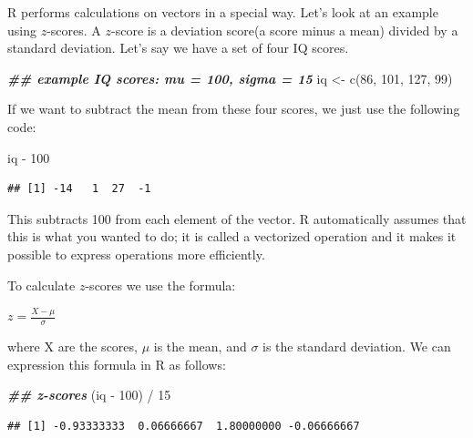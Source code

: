 \documentclass[
  oneside]{book}
\newenvironment{Shaded}{\begin{snugshade}}{\end{snugshade}}
\newcommand{\DecValTok}[1]{\textcolor[rgb]{0.00,0.00,0.81}{#1}}
\newcommand{\DocumentationTok}[1]{\textcolor[rgb]{0.56,0.35,0.01}{\textbf{\textit{#1}}}}
\newcommand{\FunctionTok}[1]{\textcolor[rgb]{0.00,0.00,0.00}{#1}}
\newcommand{\NormalTok}[1]{#1}
\newcommand{\OtherTok}[1]{\textcolor[rgb]{0.56,0.35,0.01}{#1}}
\newcommand{\SpecialCharTok}[1]{\textcolor[rgb]{0.00,0.00,0.00}{#1}}
\begin{document}
R performs calculations on vectors in a special way. Let's look at an example using \(z\)-scores. A \(z\)-score is a deviation score(a score minus a mean) divided by a standard deviation. Let's say we have a set of four IQ scores.

\begin{Shaded}
\begin{Highlighting}[]
\DocumentationTok{\#\# example IQ scores: mu = 100, sigma = 15}
\NormalTok{iq }\OtherTok{\textless{}{-}} \FunctionTok{c}\NormalTok{(}\DecValTok{86}\NormalTok{, }\DecValTok{101}\NormalTok{, }\DecValTok{127}\NormalTok{, }\DecValTok{99}\NormalTok{)}
\end{Highlighting}
\end{Shaded}

If we want to subtract the mean from these four scores, we just use the following code:

\begin{Shaded}
\begin{Highlighting}[]
\NormalTok{iq }\SpecialCharTok{{-}} \DecValTok{100}
\end{Highlighting}
\end{Shaded}

\begin{verbatim}
## [1] -14   1  27  -1
\end{verbatim}

This subtracts 100 from each element of the vector. R automatically assumes that this is what you wanted to do; it is called a vectorized operation and it makes it possible to express operations more efficiently.

To calculate \(z\)-scores we use the formula:

\(z = \frac{X - \mu}{\sigma}\)

where X are the scores, \(\mu\) is the mean, and \(\sigma\) is the standard deviation. We can expression this formula in R as follows:

\begin{Shaded}
\begin{Highlighting}[]
\DocumentationTok{\#\# z{-}scores}
\NormalTok{(iq }\SpecialCharTok{{-}} \DecValTok{100}\NormalTok{) }\SpecialCharTok{/} \DecValTok{15}
\end{Highlighting}
\end{Shaded}

\begin{verbatim}
## [1] -0.93333333  0.06666667  1.80000000 -0.06666667
\end{verbatim}
\end{document}
